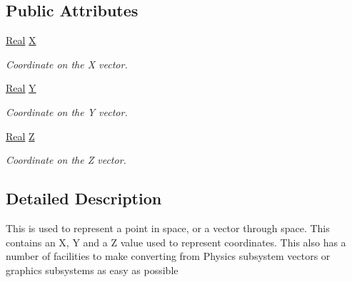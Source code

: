 \subsection*{Public Attributes}
\begin{DoxyCompactItemize}
\item 
\hypertarget{classphys_1_1Vector3_a23660f9d1e21a25c53aa06aa737bb56b}{
\hyperlink{namespacephys_af7eb897198d265b8e868f45240230d5f}{Real} \hyperlink{classphys_1_1Vector3_a23660f9d1e21a25c53aa06aa737bb56b}{X}}
\label{d5/d6a/classphys_1_1Vector3_a23660f9d1e21a25c53aa06aa737bb56b}

\begin{DoxyCompactList}\small\item\em Coordinate on the X vector. \item\end{DoxyCompactList}\item 
\hypertarget{classphys_1_1Vector3_a6c9bc2ab0995d5056dba8272c650e58e}{
\hyperlink{namespacephys_af7eb897198d265b8e868f45240230d5f}{Real} \hyperlink{classphys_1_1Vector3_a6c9bc2ab0995d5056dba8272c650e58e}{Y}}
\label{d5/d6a/classphys_1_1Vector3_a6c9bc2ab0995d5056dba8272c650e58e}

\begin{DoxyCompactList}\small\item\em Coordinate on the Y vector. \item\end{DoxyCompactList}\item 
\hypertarget{classphys_1_1Vector3_a53c84fa4b38fb9c4a4d822b04c200b13}{
\hyperlink{namespacephys_af7eb897198d265b8e868f45240230d5f}{Real} \hyperlink{classphys_1_1Vector3_a53c84fa4b38fb9c4a4d822b04c200b13}{Z}}
\label{d5/d6a/classphys_1_1Vector3_a53c84fa4b38fb9c4a4d822b04c200b13}

\begin{DoxyCompactList}\small\item\em Coordinate on the Z vector. \item\end{DoxyCompactList}\end{DoxyCompactItemize}


\subsection{Detailed Description}
This is used to represent a point in space, or a vector through space. This contains an X, Y and a Z value used to represent coordinates. This also has a number of facilities to make converting from Physics subsystem vectors or graphics subsystems as easy as possible 


